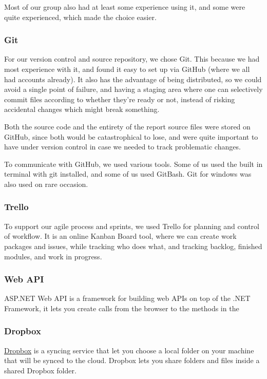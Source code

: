 Most of our group also had at least some experience using it, and some were quite experienced, which made the choice easier.

\subsubsection{Git}
For our version control and source repository, we chose Git. This because we had most experience with it, and found it easy to set up via GitHub (where we all had accounts already). It also has the advantage of being distributed, so we could avoid a single point of failure, and having a staging area where one can selectively commit files according to whether they're ready or not, instead of risking accidental changes which might break something.

Both the source code and the entirety of the report source files were stored on GitHub, since both would be catastrophical to lose, and were quite important to have under version control in case we needed to track problematic changes.

To communicate with GitHub, we used various tools. Some of us used the built in terminal with git installed, and some of us used GitBash. Git for windows was also used on rare occasion.

\subsubsection{Trello}\label{Trello}
To support our agile process and sprints, we used Trello for planning and control of workflow. It is an online Kanban Board tool, where we can create work packages and issues, while tracking who does what, and tracking backlog, finished modules, and work in progress.

\subsubsection{Web API}
ASP.NET Web API is a framework for building web APIs on top of the .NET Framework, it lets you create calls from the browser to the methods in the 

\subsubsection{Dropbox}
\href{http://www.dropbox.com}{Dropbox} is a syncing service that let you choose a local folder on your machine that will be synced to the cloud. Dropbox lets you share folders and files inside a shared Dropbox folder.

